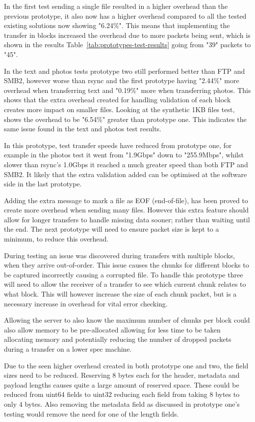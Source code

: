 In the first test sending a single file resulted in a higher overhead than the previous prototype, it also now has a higher overhead compared to all the tested existing solutions now showing "6.24\%". This means that implementing the transfer in blocks increased the overhead due to more packets being sent, which is shown in the results Table~\ref{tab:prototypes-test-results} going from "39" packets to "45".

In the text and photos tests prototype two still performed better than FTP and SMB2, however worse than rsync and the first prototype having "2.44\%" more overhead when transferring text and "0.19\%" more when transferring photos. This shows that the extra overhead created for handling validation of each block creates more impact on smaller files. Looking at the synthetic 1KB files test, shows the overhead to be "6.54\%" greater than prototype one. This indicates the same issue found in the text and photos test results.

In this prototype, test transfer speeds have reduced from prototype one, for example in the photos test it went from "1.9Gbps" down to "255.9Mbps", whilst slower than rsync's 1.0Gbps it reached a much greater speed than both FTP and SMB2. It likely that the extra validation added can be optimised at the software side in the last prototype.

Adding the extra message to mark a file as EOF (end-of-file), has been proved to create more overhead when sending many files. However this extra feature should allow for longer transfers to handle missing data sooner; rather than waiting until the end. The next prototype will need to ensure packet size is kept to a minimum, to reduce this overhead.

During testing an issue was discovered during transfers with multiple blocks, when they arrive out-of-order. This issue causes the chunks for different blocks to be captured incorrectly causing a corrupted file. To handle this prototype three will need to allow the receiver of a transfer to see which current chunk relates to what block. This will however increase the size of each chunk packet, but is a necessary increase in overhead for vital error checking.

Allowing the server to also know the maximum number of chunks per block could also allow memory to be pre-allocated allowing for less time to be taken allocating memory and potentially reducing the number of dropped packets during a transfer on a lower spec machine.

Due to the seen higher overhead created in both prototype one and two, the field sizes need to be reduced. Reserving 8 bytes each for the header, metadata and payload lengths causes quite a large amount of reserved space. These could be reduced from uint64 fields to uint32 reducing each field from taking 8 bytes to only 4 bytes. Also removing the metadata field as discussed in prototype one's testing would remove the need for one of the length fields.
